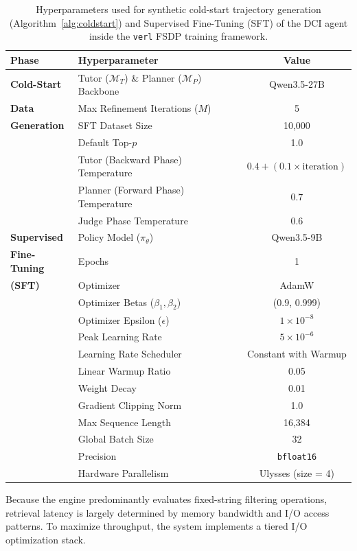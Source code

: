 \documentclass{article} %
\begin{document}
\begin{table}[!t]
\centering
\caption{Hyperparameters used for synthetic cold-start trajectory generation (Algorithm~\ref{alg:coldstart}) and Supervised Fine-Tuning (SFT) of the DCI agent inside the \texttt{verl} FSDP training framework.}
\label{tab:hyperparams-sft}
\begin{tabular}{llc}
\toprule
\textbf{Phase} & \textbf{Hyperparameter} & \textbf{Value} \\
\midrule
\textbf{Cold-Start} 
& Tutor ($\mathcal{M}_T$) \& Planner ($\mathcal{M}_P$) Backbone & Qwen3.5-27B \\
\textbf{Data} 
& Max Refinement Iterations ($M$) & 5 \\
\textbf{Generation} 
& SFT Dataset Size & 10,000 \\
& Default Top-$p$ & 1.0 \\
& Tutor (Backward Phase) Temperature & $0.4 + (0.1 \times \text{iteration})$ \\
& Planner (Forward Phase) Temperature & $0.7$ \\
& Judge Phase Temperature & $0.6$ \\
\midrule
\textbf{Supervised} 
& Policy Model ($\pi_\theta$) & Qwen3.5-9B \\
\textbf{Fine-Tuning} 
& Epochs & 1 \\
\textbf{(SFT)} 
& Optimizer & AdamW \\
& Optimizer Betas ($\beta_1, \beta_2$) & (0.9, 0.999) \\
& Optimizer Epsilon ($\epsilon$) & $1 \times 10^{-8}$ \\
& Peak Learning Rate & $5 \times 10^{-6}$ \\
& Learning Rate Scheduler & Constant with Warmup \\
& Linear Warmup Ratio & 0.05 \\
& Weight Decay & 0.01 \\
& Gradient Clipping Norm & 1.0 \\
& Max Sequence Length & 16,384 \\
& Global Batch Size & 32 \\
& Precision & \texttt{bfloat16} \\
& Hardware Parallelism & Ulysses (size = 4) \\
\bottomrule
\end{tabular}
\end{table}


Because the engine predominantly evaluates fixed-string filtering operations, retrieval latency is largely determined by memory bandwidth and I/O access patterns. To maximize throughput, the system implements a tiered I/O optimization stack.
\end{document}
